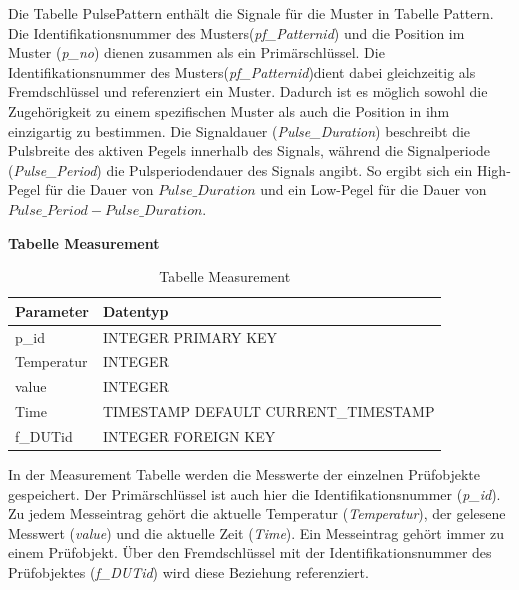Die Tabelle PulsePattern enthält die Signale für die Muster in Tabelle Pattern. Die Identifikationsnummer des Musters(\textit{pf\_Patternid}) und die Position im Muster (\textit{p\_no}) dienen zusammen als ein Primärschlüssel. Die Identifikationsnummer des Musters(\textit{pf\_Patternid})dient dabei gleichzeitig als Fremdschlüssel und referenziert ein Muster. Dadurch ist es möglich sowohl die Zugehörigkeit zu einem spezifischen Muster als auch die Position in ihm einzigartig zu bestimmen. Die Signaldauer (\textit{Pulse\_Duration}) beschreibt die Pulsbreite des aktiven Pegels innerhalb des Signals, während die Signalperiode (\textit{Pulse\_Period}) die Pulsperiodendauer des Signals angibt. So ergibt sich ein High-Pegel für die Dauer von $Pulse\_Duration$ und ein Low-Pegel für die Dauer von $Pulse\_Period - Pulse\_Duration$.\\

\newpage

\textbf{Tabelle Measurement}\\

\begin{table}[H]
\begin{center}
\begin{tabular}{|l|l|}\hline
Parameter & Datentyp \\ \hline
p\_id & INTEGER PRIMARY KEY \\ 
Temperatur & INTEGER\\
value & INTEGER\\
Time & TIMESTAMP DEFAULT CURRENT\_TIMESTAMP\\ 
f\_DUTid & INTEGER FOREIGN KEY\\ \hline
\end{tabular}
\caption{Tabelle Measurement}
\label{table_TabelleMeasurement}
\end{center}
\end{table}

In der Measurement Tabelle werden die Messwerte der einzelnen Prüfobjekte gespeichert. Der Primärschlüssel ist auch hier die Identifikationsnummer (\textit{p\_id}). Zu jedem Messeintrag gehört die aktuelle Temperatur (\textit{Temperatur}), der gelesene Messwert (\textit{value}) und die aktuelle Zeit (\textit{Time}). Ein Messeintrag gehört immer zu einem Prüfobjekt. Über den Fremdschlüssel mit der Identifikationsnummer des Prüfobjektes (\textit{f\_DUTid}) wird diese Beziehung referenziert. 




